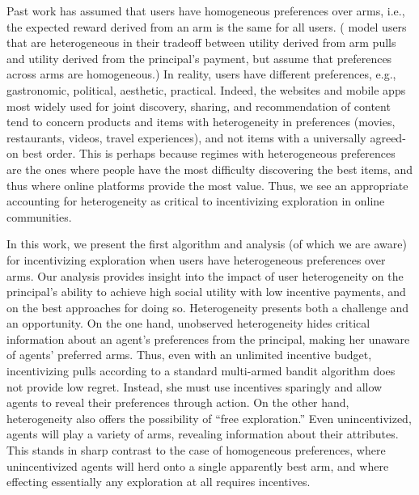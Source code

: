 Past work has assumed that users have homogeneous preferences over
arms, i.e., the expected reward derived from an arm is the same for all users.
(\citet{han2015incentivizing} model users that are
heterogeneous in their tradeoff between utility derived from arm pulls
and utility derived from the principal's payment,
but assume that preferences across arms are homogeneous.)
In reality, users have different preferences, e.g., gastronomic,
political, aesthetic, practical.
Indeed, the websites and mobile apps most widely used for joint discovery,
sharing, and recommendation of content tend to concern products and items 
with heterogeneity in preferences (movies, restaurants,
videos, travel experiences), and not items with a universally
agreed-on best order.
This is perhaps because regimes with heterogeneous preferences are the
ones where people have the most difficulty discovering the best items, 
and thus where online platforms provide the most value.  
Thus, we see an appropriate
accounting for heterogeneity as critical to incentivizing
exploration in online communities.

In this work, we present the first algorithm and analysis (of which we
are aware) for incentivizing exploration when users have heterogeneous 
preferences over arms.
Our analysis provides insight into the
impact of user heterogeneity on the principal's ability to achieve
high social utility with low incentive payments,
and on the best approaches for doing so.
Heterogeneity presents both a challenge and an opportunity.
On the one hand, unobserved heterogeneity hides critical
information about an agent's preferences from the principal,
making her unaware of agents' preferred arms.
Thus, even with an unlimited incentive budget, incentivizing 
pulls according to a standard multi-armed bandit algorithm does not provide
low regret.  Instead, she must use incentives sparingly and 
allow agents to reveal their preferences through action.
On the other hand, heterogeneity also offers
the possibility of ``free exploration.''
Even unincentivized, agents will
play a variety of arms, revealing information about their attributes.
This stands in sharp contrast to the case of homogeneous preferences,
where unincentivized agents will herd onto a single apparently best arm,
and where effecting essentially any exploration at all requires incentives.


